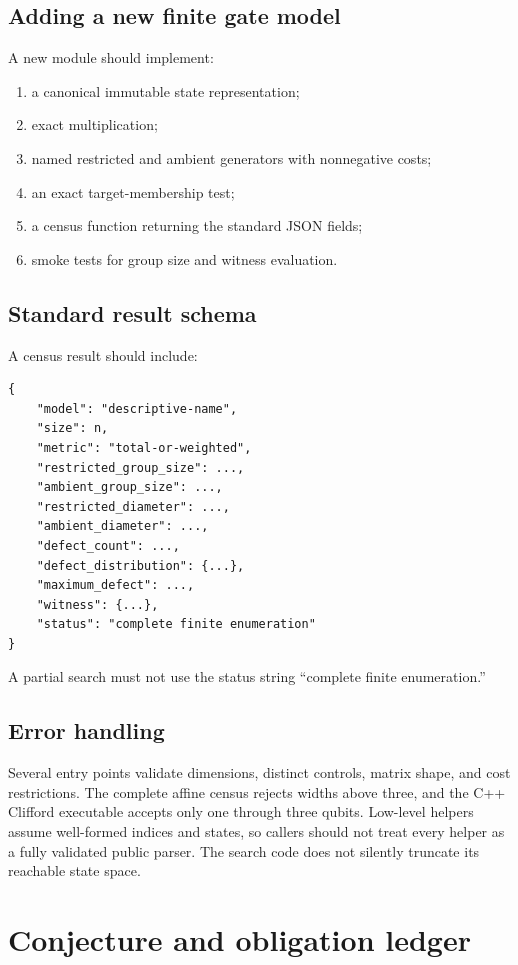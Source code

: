 \subsection{Adding a new finite gate model}
A new module should implement:
\begin{enumerate}
\item a canonical immutable state representation;
\item exact multiplication;
\item named restricted and ambient generators with nonnegative costs;
\item an exact target-membership test;
\item a census function returning the standard JSON fields;
\item smoke tests for group size and witness evaluation.
\end{enumerate}

\subsection{Standard result schema}
A census result should include:
\begin{lstlisting}[style=pythonstyle]
{
    "model": "descriptive-name",
    "size": n,
    "metric": "total-or-weighted",
    "restricted_group_size": ...,
    "ambient_group_size": ...,
    "restricted_diameter": ...,
    "ambient_diameter": ...,
    "defect_count": ...,
    "defect_distribution": {...},
    "maximum_defect": ...,
    "witness": {...},
    "status": "complete finite enumeration"
}
\end{lstlisting}
A partial search must not use the status string ``complete finite enumeration.''

\subsection{Error handling}
Several entry points validate dimensions, distinct controls, matrix shape, and cost restrictions.  The complete affine census rejects widths above three, and the C++ Clifford executable accepts only one through three qubits.  Low-level helpers assume well-formed indices and states, so callers should not treat every helper as a fully validated public parser.  The search code does not silently truncate its reachable state space.

\section{Conjecture and obligation ledger}\label{g:app:ledger}


